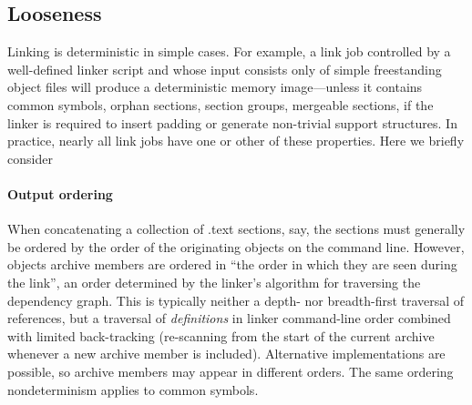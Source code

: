 
\subsection{Looseness}
\label{sec:looseness}

Linking is deterministic in simple cases.
For example, a link job controlled by a well-defined linker script
and whose input consists only of simple freestanding object files
will produce a deterministic memory image---unless it contains common symbols, 
orphan sections, section groups, mergeable sections, 
if the linker is required to insert padding
or generate non-trivial support structures.
In practice, nearly all link jobs have one or other of these properties.
Here we briefly consider

\paragraph{Output ordering}
When concatenating a collection of \textsf{.text} sections, say, 
the sections must generally be ordered by the order of the originating objects on the command line.
However, objects archive members are ordered in ``the order in which they are seen during the link'', 
an order determined by the linker's algorithm for traversing the dependency graph.
This is typically neither a depth- nor breadth-first traversal of references,
but a traversal of \emph{definitions} in linker command-line order
combined with limited back-tracking 
(re-scanning from the start of the current archive whenever a new archive
member is included).
Alternative implementations are possible, so archive members may appear in different orders.
The same ordering nondeterminism applies to common symbols.

